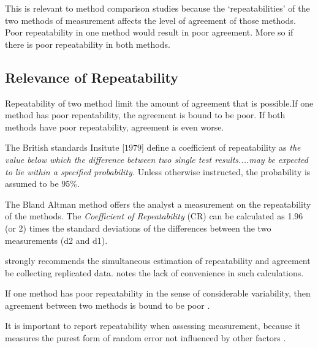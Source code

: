 This is relevant to method comparison studies because the `repeatabilities' of the two methods of measurement affects the level of agreement of those methods. Poor repeatability in one method would result in poor agreement. More so if there is poor repeatability in both methods.

\subsection{Relevance of Repeatability} Repeatability of two method limit the amount of agreement that is possible.If one method has poor repeatability, the agreement is bound to be poor. If both methods have poor repeatability, agreement is even worse.

The British standards Insitute [$1979$] define a coefficient of
repeatability  as \emph{the value below which the difference
between two single test results....may be expected to lie within a
specified probability.} Unless otherwise instructed, the
probability is assumed to be $95\%$.

The Bland Altman method offers the analyst a measurement on the repeatability of the methods. The \emph{Coefficient of Repeatability} (CR) can be calculated as 1.96 (or 2) times the standard deviations of the differences between the two measurements (d2 and d1).


\citet{BA99} strongly recommends the simultaneous estimation of repeatability and agreement be collecting replicated data. \citet{ARoy2009} notes the lack of convenience in such calculations.


If one method has poor repeatability in the sense of considerable variability, then agreement between two methods is bound to be poor \citep{ARoy2009}.

It is important to report repeatability when assessing measurement, because it measures the purest form of random error not influenced by other factors \citep{Barnhart}.
